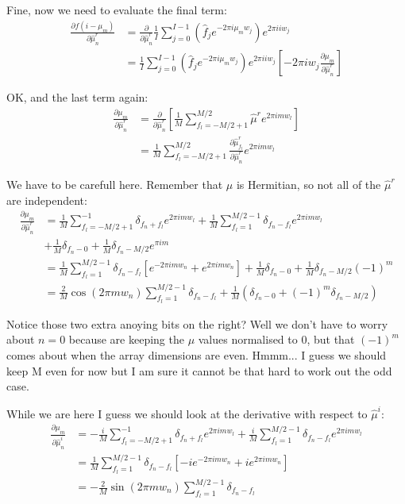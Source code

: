 \documentclass[11pt]{article}
\begin{document}
Fine, now we need to evaluate the final term:
\begin{align}
   \frac{\partial f(i - \mu_m)}{\partial \hat{\mu}^r_n} &= \frac{\partial}{\partial \hat{\mu}^r_n} \frac{1}{I} \sum_{j=0}^{I-1} (\hat{f}_j e^{-2\pi i \mu_m w_j}) e^{2\pi i i w_j} \\
   &= \frac{1}{I} \sum_{j=0}^{I-1} (\hat{f}_j e^{-2\pi i \mu_m w_j}) e^{2\pi i i w_j} \left[-2\pi i w_j \frac{\partial \mu_m}{\partial \hat{\mu}^r_n} \right]
\end{align}


OK, and the last term again:
\begin{align}
   \frac{\partial \mu_m}{\partial \hat{\mu}^r_n} &= \frac{\partial}{\partial \hat{\mu}^r_n} \left[\frac{1}{M} \sum_{f_l=-M/2 + 1}^{M/2} \hat{\mu}^r e^{2\pi i mw_l} \right] \\ 
   &= \frac{1}{M} \sum_{f_l=-M/2 + 1}^{M/2} \frac{\partial \hat{\mu}^r_{f_l}}{\partial \hat{\mu}^r_n} e^{2\pi i mw_l} 
\end{align}


We have to be carefull here. Remember that $\hat{\mu}$ is Hermitian, so not all of the $\hat{\mu}^r$ are independent:
\begin{align}
   \frac{\partial \mu_m}{\partial \hat{\mu}^r_n} &= \frac{1}{M} \sum_{f_l=-M/2 + 1}^{-1} \delta_{f_n + f_l} e^{2\pi i mw_l} + \frac{1}{M} \sum_{f_l=1}^{M/2-1} \delta_{f_n - f_l} e^{2\pi i mw_l} \\
   &+ \frac{1}{M} \delta_{f_n - 0} + \frac{1}{M} \delta_{f_n - M/2} e^{\pi i m} \\
   &= \frac{1}{M} \sum_{f_l=1}^{M/2-1} \delta_{f_n - f_l} \left[e^{-2\pi i mw_n} + e^{2\pi i mw_n} \right] + \frac{1}{M} \delta_{f_n - 0} + \frac{1}{M} \delta_{f_n - M/2} (-1)^m\\
   &= \frac{2}{M} \cos(2\pi mw_n) \sum_{f_l=1}^{M/2-1} \delta_{f_n - f_l} + \frac{1}{M}\left(\delta_{f_n - 0} +  (-1)^m \delta_{f_n - M/2} \right)
\end{align}

Notice those two extra anoying bits on the right? Well we don't have to worry about $n = 0$ because are keeping the $\mu$ values normalised to 0, but that $(-1)^m$ comes about when the array dimensions are even. Hmmm... I guess we should keep M even for now but I am sure it cannot be that hard to work out the odd case. 

\pagebreak
While we are here I guess we should look at the derivative with respect to $\hat{\mu}^i$:
\begin{align}
   \frac{\partial \mu_m}{\partial \hat{\mu}^i_n} &= -\frac{i}{M} \sum_{f_l=-M/2 + 1}^{-1} \delta_{f_n + f_l} e^{2\pi i mw_l} + \frac{i}{M} \sum_{f_l=1}^{M/2-1} \delta_{f_n - f_l} e^{2\pi i mw_l} \\
   &= \frac{1}{M} \sum_{f_l=1}^{M/2-1} \delta_{f_n - f_l} \left[-ie^{-2\pi i mw_n} + ie^{2\pi i mw_n} \right] \\
   &= -\frac{2}{M} \sin(2\pi mw_n) \sum_{f_l=1}^{M/2-1} \delta_{f_n - f_l} 
\end{align}
\end{document}
